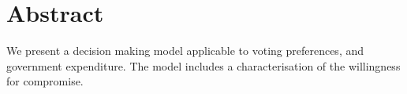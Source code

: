 \documentclass[
10pt, %
a4paper, %
oneside, %
headinclude,footinclude, %
BCOR5mm, %
]{scrartcl}
\title{\normalfont\spacedallcaps{Expenditure Model Abstract}} %
\author{\spacedlowsmallcaps{Caleb Moses\textsuperscript{1}}} %
\date{\today} %
\begin{document}

\renewcommand{\sectionmark}[1]{\markright{\spacedlowsmallcaps{#1}}} %
\lehead{\mbox{\llap{\small\thepage\kern1em\color{halfgray} \vline}\color{halfgray}\hspace{0.5em}\rightmark\hfil}} %

\pagestyle{scrheadings} %


\maketitle %

\setcounter{tocdepth}{2} %

\tableofcontents %

\listoffigures %

\listoftables %


\section*{Abstract} %

We present a decision making model applicable to voting preferences, and government expenditure. The model includes a characterisation of the willingness for compromise.
\end{document}
